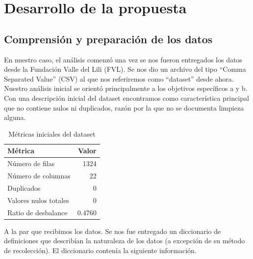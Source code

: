 \section{Desarrollo de la propuesta}

\subsection{Comprensión y preparación de los datos}

En nuestro caso, el análisis comenzó una vez se nos fueron entregados los datos desde la Fundación Valle del Lili (FVL). Se nos dio un archivo del tipo ``Comma Separated Value'' (CSV) al que nos referiremos como ``dataset'' desde ahora. Nuestro análisis inicial se orientó principalmente a los objetivos específicos a y b. Con una descripción inicial del dataset encontramos como característica principal que no contiene nulos ni duplicados, razón por la que no se documenta limpieza alguna.

\begin{table}[H]
\centering
\caption{Métricas iniciales del dataset}
\begin{tabular}{|l|r|}
\hline
\textbf{Métrica} & \textbf{Valor} \\ \hline
Número de filas & 1324 \\ \hline
Número de columnas & 22 \\ \hline
Duplicados & 0 \\ \hline
Valores nulos totales & 0 \\ \hline
Ratio de desbalance & 0.4760 \\ \hline
\end{tabular}
\end{table}

A la par que recibimos los datos. Se nos fue entregado un diccionario de definiciones que describían la naturaleza de los datos (a excepción de su método de recolección). El diccionario contenía la siguiente información.

